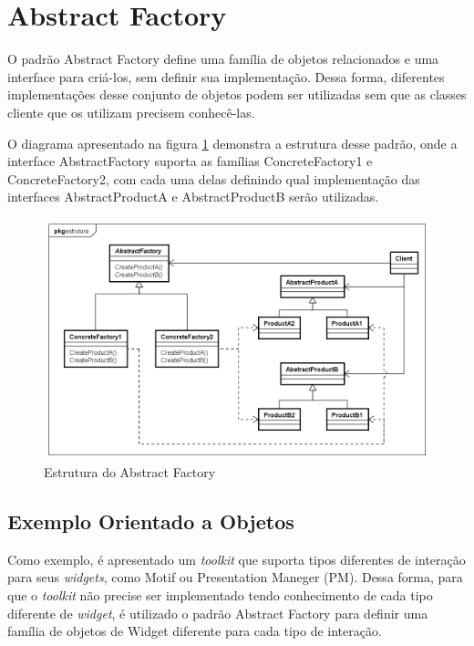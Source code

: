 \section{Abstract Factory}

O padrão Abstract Factory define uma família 
de objetos relacionados e uma interface para 
criá-los, sem definir sua implementação. Dessa 
forma, diferentes implementações desse 
conjunto de objetos podem ser utilizadas 
sem que as classes cliente que os utilizam 
precisem conhecê-las.

O diagrama apresentado na figura \ref{abfactory_struct} 
demonstra a estrutura desse padrão, onde a 
interface AbstractFactory suporta as famílias 
ConcreteFactory1 e ConcreteFactory2, com cada uma 
delas definindo qual implementação das interfaces 
AbstractProductA e AbstractProductB serão 
utilizadas.

\begin{figure}[htb]
	\caption{\label{abfactory_struct}Estrutura do Abstract Factory}
	\begin{center}
	    \includegraphics[scale=0.5]{5_padroes-contexto-funcional/5.1_criacionais/5.1.2_abstract-factory/abstractfactory_estrutura.png}
	\end{center}
\end{figure}

\subsection*{Exemplo Orientado a Objetos}

Como exemplo, é apresentado um \textit{toolkit} 
que suporta tipos diferentes de interação para 
seus \textit{widgets}, como Motif ou Presentation 
Maneger (PM). Dessa forma, para que o \textit{toolkit} 
não precise ser implementado tendo conhecimento 
de cada tipo diferente de \textit{widget}, é 
utilizado o padrão Abstract Factory para 
definir uma família de objetos de Widget 
diferente para cada tipo de interação. 

